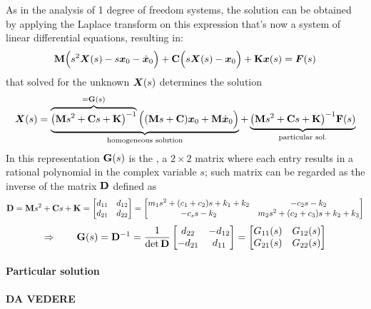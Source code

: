 	As in the analysis of 1 degree of freedom systems, the solution can be obtained by applying the Laplace transform on this expression that's now a system of linear differential equations, resulting in:
	\[ \mathbf{M}\Big( s^2 \boldsymbol{X}(s) - s \boldsymbol{x}_0 - \dot{\boldsymbol{x}}_0 \Big) + \mathbf{C} \Big( s\boldsymbol{X}(s) - \boldsymbol{x}_0 \Big) + \mathbf{K} \boldsymbol{x}(s) = \boldsymbol{F}(s) \]
	that solved for the unknown $\boldsymbol{X}(s)$ determines the solution
	\begin{equation}
		\boldsymbol{X}(s) = \underbrace{\overbrace{\big(\mathbf{M} s^2 +\mathbf{C} s + \mathbf{K}\big)^{-1}}^{= \mathbf{G}(s)} \Big( (\mathbf{M} s + \mathbf{C})\boldsymbol{x}_0 + \mathbf{M} \dot{\boldsymbol{x}}_0 \Big)}_\textrm{homogeneous solution} + \underbrace{\big(\mathbf{M} s^2 +\mathbf{C} s + \mathbf{K}\big)^{-1} \mathbf{F}(s) }_\textrm{particular sol.}
	\end{equation}
	In this representation $\mathbf{G}(s)$ is the , a $2\times 2$ matrix where each entry results in a rational polynomial in the complex variable $s$; such matrix can be regarded as the inverse of the matrix $\mathbf{D}$ defined as
	\[ \mathbf{D} = \mathbf{M} s^2 + \mathbf{C} s + \mathbf{K} = \begin{bmatrix} d_{11} & d_{12} \\ d_{21} & d_{22} \end{bmatrix} = \begin{bmatrix}  m_1 s^2 + (c_1+c_2)s + k_1 + k_2 & -c_2 s - k_2 \\ -c_s s - k_2 & m_2s^2 + (c_2+c_3)s + k_2 + k_3  \end{bmatrix} \]
	\[ \Rightarrow \qquad \mathbf{G}(s) = \mathbf{D}^{-1} = \frac 1{\det \mathbf{D}} \begin{bmatrix} d_{22} & - d_{12} \\ - d_{21} & d_{11}  \end{bmatrix} = \begin{bmatrix}  G_{11}(s) & G_{12}(s) \\ G_{21}(s) & G_{22}(s)  \end{bmatrix}   \]
	
	\paragraph{Particular solution} \textbf{DA VEDERE}
	
